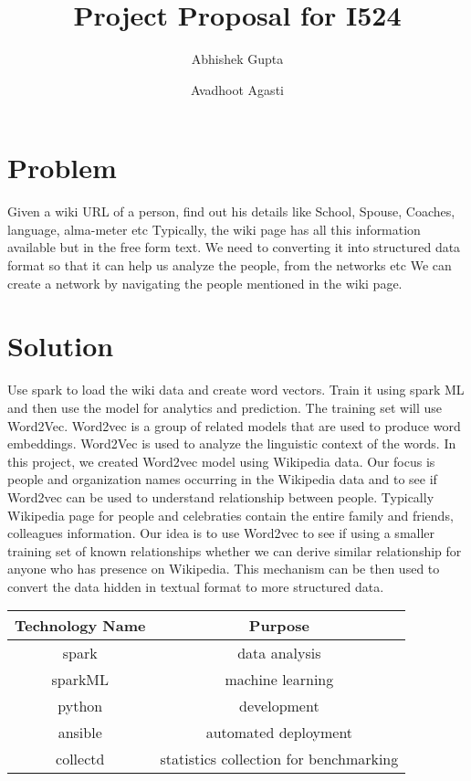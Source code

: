 \documentclass[9pt,twocolumn,twoside]{styles/osajnl}
\title{Project Proposal for I524}
\author[1,*]{Abhishek Gupta}
\author[1, **]{Avadhoot Agasti}
\affil[1]{School of Informatics and Computing, Bloomington, IN 47408, U.S.A.}
\affil[*]{Corresponding authors: abhigupt@iu.edu}
\affil[**]{Corresponding authors: aagasti@iu.edu}
\begin{document}
\maketitle

\section{Problem}

Given a wiki URL of a person, find out his details like School, Spouse, Coaches, language, alma-meter etc Typically, the wiki page has all this information available but in the free form text. We need to converting it into structured data format so that it can help us analyze the people, from the networks etc We can create a network by navigating the people mentioned in the wiki page. 

\section{Solution}

Use spark \cite{www-spark-python} to load the wiki data and create word vectors. Train it using spark ML  \cite{www-sparkml} and then use the model for analytics and prediction. The training set will use Word2Vec. Word2vec \cite{www-word2vec} is a group of related models that are used to produce word embeddings. Word2Vec is used to analyze the linguistic context of the words. In this project, we created Word2vec model using Wikipedia data. Our focus is people and organization names occurring in the Wikipedia data and to see if Word2vec can be used to understand relationship between people. Typically Wikipedia page for people and celebraties contain the entire family and friends, colleagues information. Our idea is to use Word2vec to see if using a smaller training set of known relationships whether we can derive similar relationship for anyone who has presence on Wikipedia. This mechanism can be then used to convert the data hidden in textual format to more structured data. 

\begin{center}
 \begin{tabular}{||c c||} 
 \hline
 Technology Name & Purpose  \\ [0.5ex] 
 \hline\hline
 spark \cite{www-spark-python} & data analysis  \\
 \hline
 sparkML \cite{www-sparkml} & machine learning  \\
 \hline
 python \cite{www-spark-python} & development \\
 \hline
 ansible \cite{www-ansible} & automated deployment \\
 \hline
 collectd \cite{www-collectd} & statistics collection for benchmarking \\
 \hline
\end{tabular}
\end{center}
\end{document}
